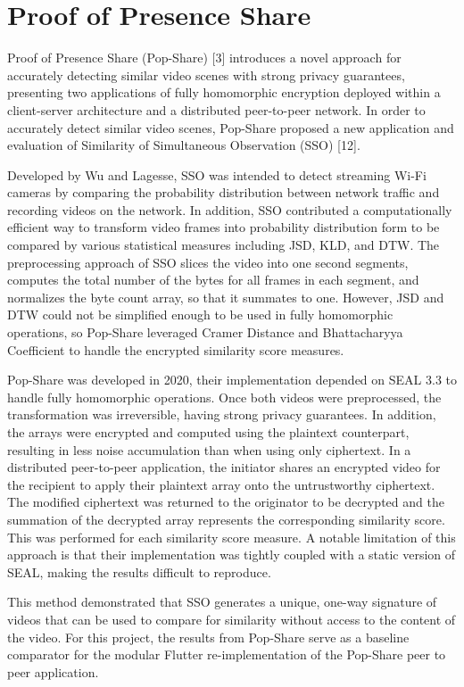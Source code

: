\section{Proof of Presence Share}

Proof of Presence Share (Pop-Share) [3] introduces a novel approach for accurately detecting similar video scenes with strong privacy guarantees, presenting two applications of fully homomorphic encryption deployed within a client-server architecture and a distributed peer-to-peer network. In order to accurately detect similar video scenes, Pop-Share proposed a new application and evaluation of Similarity of Simultaneous Observation (SSO) [12].

Developed by Wu and Lagesse, SSO was intended to detect streaming Wi-Fi cameras by comparing the probability distribution between network traffic and recording videos on the network. In addition, SSO contributed a computationally efficient way to transform video frames into probability distribution form to be compared by various statistical measures including JSD, KLD, and DTW. The preprocessing approach of SSO slices the video into one second segments, computes the total number of the bytes for all frames in each segment, and normalizes the byte count array, so that it summates to one. However, JSD and DTW could not be simplified enough to be used in fully homomorphic operations, so Pop-Share leveraged Cramer Distance and Bhattacharyya Coefficient to handle the encrypted similarity score measures.

Pop-Share was developed in 2020, their implementation depended on SEAL 3.3 to handle fully homomorphic operations. Once both videos were preprocessed, the transformation was irreversible, having strong privacy guarantees. In addition, the arrays were encrypted and computed using the plaintext counterpart, resulting in less noise accumulation than when using only ciphertext. In a distributed peer-to-peer application, the initiator shares an encrypted video for the recipient to apply their plaintext array onto the untrustworthy ciphertext. The modified ciphertext was returned to the originator to be decrypted and the summation of the decrypted array represents the corresponding similarity score. This was performed for each similarity score measure. A notable limitation of this approach is that their implementation was tightly coupled with a static version of SEAL, making the results difficult to reproduce.

This method demonstrated that SSO generates a unique, one-way signature of videos that can be used to compare for similarity without access to the content of the video. For this project, the results from Pop-Share serve as a baseline comparator for the modular Flutter re-implementation of the Pop-Share peer to peer application.

